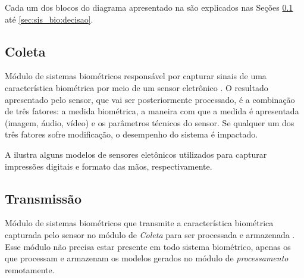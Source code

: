 \par Cada um dos blocos do diagrama apresentado na  são explicados nas Seções \ref{sec:sis_bio:coleta} até \ref{sec:sis_bio:decisao}.


\subsection{Coleta} \label{sec:sis_bio:coleta}

\par Módulo de sistemas biométricos responsável por capturar sinais de uma característica biométrica por meio de um sensor eletrônico \cite{wayman2005biometric}. O resultado apresentado pelo sensor, que vai ser posteriormente processado, é a combinação de três fatores: a medida biométrica, a maneira com que a medida é apresentada (imagem, áudio, vídeo) e os parâmetros técnicos do sensor. Se qualquer um dos três fatores sofre modificação, o desempenho do sistema é impactado.

\par A  ilustra alguns modelos de sensores eletônicos utilizados para capturar impressões digitais e formato das mãos, respectivamente.


\subsection{Transmissão}\label{sec:sis_bio:transmissao}

\par Módulo de sistemas biométricos que transmite a característica biométrica capturada pelo sensor no módulo de \textit{Coleta} para ser processada e armazenada \cite{wayman2005biometric}. Esse módulo não precisa estar presente em todo sistema biométrico, apenas os que processam e armazenam os modelos gerados no módulo de \textit{processamento} remotamente.

